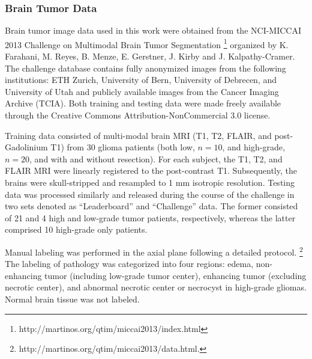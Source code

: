 \documentclass[final,5p,times,twocolumn]{elsarticle}
\begin{document}



\subsubsection{Brain Tumor Data}

Brain tumor image data used in this work were obtained from the NCI-MICCAI 2013 
Challenge on Multimodal Brain Tumor Segmentation%
\footnote{
http://martinos.org/qtim/miccai2013/index.html
}
organized by K. Farahani, M. Reyes, B. Menze, E. Gerstner, J. Kirby and J. Kalpathy-Cramer. 
The challenge database contains fully anonymized images from the following institutions: 
ETH Zurich, University of Bern, University of Debrecen, and University of Utah and 
publicly available images from the Cancer Imaging Archive (TCIA).  Both training 
and testing data were made freely available through the Creative Commons Attribution-NonCommercial 3.0 license.

Training data consisted of multi-modal brain MRI (T1, T2, FLAIR, and 
post-Gadolinium T1) from 30 glioma patients (both low, $n=10$, and high-grade, $n=20$,
and with and without resection).  For each subject, the T1, T2, and 
FLAIR MRI were linearly registered to the post-contrast T1.  Subsequently,
the brains were skull-stripped and resampled to 1 mm isotropic resolution.
Testing data was processed similarly and released during the course of the
challenge in two sets denoted as ``Leaderboard'' and ``Challenge'' data.  
The former consisted of 21 and 4 high and low-grade tumor patients, respectively,
whereas the latter comprised 10 high-grade only patients.

Manual labeling was performed in the axial plane following a detailed
protocol.%
\footnote{
http://martinos.org/qtim/miccai2013/data.html.
}
The labeling of pathology was categorized into four regions:
edema, non-enhancing tumor (including low-grade tumor center), 
enhancing tumor (excluding necrotic center), and abnormal
necrotic center or necrocyst in high-grade gliomas.
Normal brain tissue was not labeled. 
\end{document}
